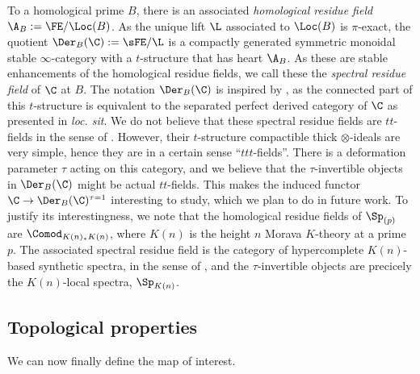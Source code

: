 \begin{remark}
    To a homological prime $B$, there is an associated \emph{homological residue field} $\A_B:= \FE/\Loc(B)$. As the unique lift $\L$ associated to $\Loc(B)$ is $\pi$-exact, the quotient $\Der_B(\C):= \sFE/\L$ is a compactly generated symmetric monoidal stable $\infty$-category with a $t$-structure that has heart $\A_B$. As these are stable enhancements of the homological residue fields, we call these the \emph{spectral residue field} of $\C$ at $B$. The notation $\Der_B(\C)$ is inspired by \cite{patchkoria-pstragowski_2021}, as the connected part of this $t$-structure is equivalent to the separated perfect derived category of $\C$ as presented in \emph{loc. sit}. We do not believe that these spectral residue fields are $tt$-fields in the sense of \cite[Definition 1.1]{balmer_krause_stevenson_2019}. However, their $t$-structure compactible thick $\otimes$-ideals are very simple, hence they are in a certain sense ``$ttt$-fields''. There is a deformation parameter $\tau$ acting on this category, and we believe that the $\tau$-invertible objects in $\Der_B(\C)$ might be actual $tt$-fields. This makes the induced functor $\C\to \Der_B(\C)^{\tau=1}$ interesting to study, which we plan to do in future work. To justify its interestingness, we note that the homological residue fields of $\Sp_{(p)}$ are $\Comod_{K(n)_*K(n)}$, where $K(n)$ is the height $n$ Morava $K$-theory at a prime $p$. The associated spectral residue field is the category of hypercomplete $K(n)$-based synthetic spectra, in the sense of \cite{pstragowski_2022}, and the $\tau$-invertible objects are precicely the $K(n)$-local spectra, $\Sp_{K(n)}$. 
\end{remark}








\subsection{Topological properties}

We can now finally define the map of interest.

